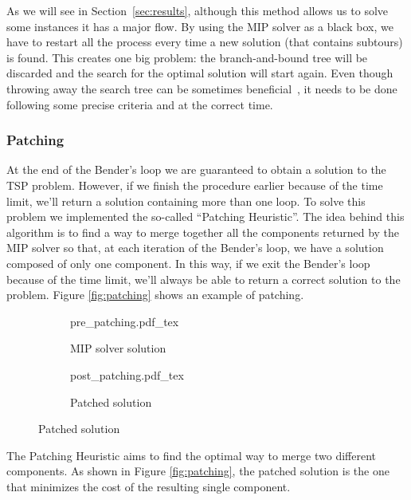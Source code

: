\documentclass{article}
\begin{document}
As we will see in Section~\ref{sec:results}, although this method allows us to
solve some instances it has a major flow. By using the MIP solver as a black
box, we have to restart all the process every time a new solution (that
contains subtours) is found. This creates one big problem: the branch-and-bound
tree will be discarded and the search for the optimal solution will start again.
Even though throwing away the search tree can be sometimes beneficial~\cite{achterberg2009scip}\cite{achterberg2007constraint},
it needs to be done following some precise criteria and at the correct time.

\subsubsection{Patching}
\label{sssec:patching}
At the end of the Bender's loop we are guaranteed to obtain a solution to the TSP problem.
However, if we finish the procedure earlier because of the time limit, we'll return a solution containing more than
one loop. To solve this problem we implemented the so-called ``Patching Heuristic''.
The idea behind this algorithm is to find a way to merge together all the components returned by the MIP solver
so that, at each iteration of the Bender's loop, we have a solution composed of only one component.
In this way, if we exit the Bender's loop because of the time limit, we'll always be able to return a
correct solution to the problem.
Figure \ref{fig:patching} shows an example of patching.

\begin{figure}[H]
        \caption{Example of patching}
        \label{fig:patching}
        \centering
        \begin{subfigure}{.5\textwidth}
                \centering
                \def\svgwidth{.7\linewidth}
                {pre_patching.pdf_tex}
                \caption{MIP solver solution}
        \end{subfigure}%
        \begin{subfigure}{.5\textwidth}
                \centering
                \def\svgwidth{.7\linewidth}
                {post_patching.pdf_tex}
                \caption{Patched solution}
        \end{subfigure}
\end{figure}

The Patching Heuristic aims to find the optimal way to merge two different components. As shown
in Figure \ref{fig:patching}, the patched solution is the one that minimizes the cost of the
resulting single component.
\end{document}

